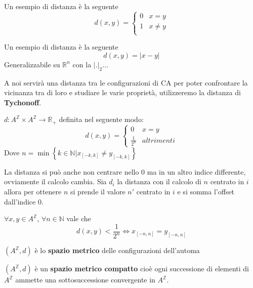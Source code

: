 \begin{esempio}
    Un esempio di distanza è la seguente
    $$d(x,y) =\begin{cases}
            0 & x=y    \\
            1 & x\ne y \\
        \end{cases}$$
\end{esempio}

\begin{esempio}
    Un esempio di distanza è la seguente
    $$d(x,y) =|x-y|$$
    Generalizzabile su $\mathbb{R}^n$ con la $|.|_2$$\dots$
\end{esempio}

A noi servirà una distanza tra le configurazioni di CA per poter confrontare
la vicinanza tra di loro e studiare le varie proprietà, utilizzeremo la distanza di
\textbf{Tychonoff}.
\begin{definizione} 
    $d:A^\mathbb{Z}\times A^\mathbb{Z} \rightarrow \mathbb{R}_+$ definita nel
    seguente modo:
    $$d(x,y) = \begin{cases}
            0             & x=y        \\
            \frac{1}{2^n} & altrimenti
        \end{cases}$$
    Dove $n= \min\left\{k\in \mathbb{N} | x_{[-k,k]} \ne y_{[-k,k]}\right\}$
\end{definizione}

La distanza si può anche non centrare nello $0$ ma in un altro indice differente,
ovviamente il calcolo cambia. Sia $d_i$ la distanza con il calcolo di $n$ centrato
in $i$ allora per ottenere $n$ si prende il valore $n'$ centrato in $i$ e si somma
l'offset dall'indice $0$.

\begin{nota}  \label{prop:dist}
    $\forall x,y\in A^\mathbb{Z}$, $\forall n\in \mathbb{N}$ vale che
    $$d(x,y)< \frac{1}{2^n}\iff x_{[-n, n]}=y_{[-n, n]}$$
\end{nota}

\begin{definizione}
    $(A^\mathbb{Z}, d)$ è lo \textbf{spazio metrico} delle configurazioni dell'automa
\end{definizione}

\begin{nota} 
    $(A^\mathbb{Z}, d)$ è un \textbf{spazio metrico compatto} cioè ogni successione
    di elementi di $A^\mathbb{Z}$ ammette una sottosuccessione convergente in $A^\mathbb{Z}$.
\end{nota}


